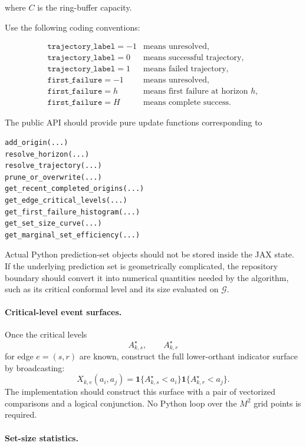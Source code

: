 \documentclass[11pt]{article}
\begin{document}
where $C$ is the ring-buffer capacity.

Use the following coding conventions:

\[
\begin{array}{ll}
\texttt{trajectory\_label}=-1
&
\text{means unresolved},
\\
\texttt{trajectory\_label}=0
&
\text{means successful trajectory},
\\
\texttt{trajectory\_label}=1
&
\text{means failed trajectory},
\\
\texttt{first\_failure}=-1
&
\text{means unresolved},
\\
\texttt{first\_failure}=h
&
\text{means first failure at horizon }h,
\\
\texttt{first\_failure}=H
&
\text{means complete success}.
\end{array}
\]

The public API should provide pure update functions corresponding to

\begin{verbatim}
add_origin(...)
resolve_horizon(...)
resolve_trajectory(...)
prune_or_overwrite(...)
get_recent_completed_origins(...)
get_edge_critical_levels(...)
get_first_failure_histogram(...)
get_set_size_curve(...)
get_marginal_set_efficiency(...)
\end{verbatim}

Actual Python prediction-set objects should not be stored inside the JAX
state.  If the underlying prediction set is geometrically complicated, the
repository boundary should convert it into numerical quantities needed by the
algorithm, such as its critical conformal level and its size evaluated on
$\mathcal G$.

\paragraph{Critical-level event surfaces.}

Once the critical levels
\[
    A^\star_{k,s},
    \qquad
    A^\star_{k,r}
\]
for edge $e=(s,r)$ are known, construct the full lower-orthant indicator
surface by broadcasting:
\[
    X_{k,e}(a_i,a_j)
    =
    \mathbf 1\{
        A^\star_{k,s}<a_i
    \}
    \mathbf 1\{
        A^\star_{k,r}<a_j
    \}.
\]
The implementation should construct this surface with a pair of vectorized
comparisons and a logical conjunction.  No Python loop over the $M^2$ grid
points is required.

\paragraph{Set-size statistics.}
\end{document}
